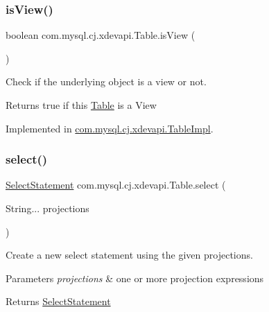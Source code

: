 \mbox{\label{interfacecom_1_1mysql_1_1cj_1_1xdevapi_1_1_table_a17dc243982bdbd3c0024699d3fb5bd5e}} 
\subsubsection{\texorpdfstring{is\+View()}{isView()}}
{\footnotesize\ttfamily boolean com.\+mysql.\+cj.\+xdevapi.\+Table.\+is\+View (\begin{DoxyParamCaption}{ }\end{DoxyParamCaption})}

Check if the underlying object is a view or not.

\begin{DoxyReturn}{Returns}
true if this \mbox{\hyperlink{interfacecom_1_1mysql_1_1cj_1_1xdevapi_1_1_table}{Table}} is a View 
\end{DoxyReturn}


Implemented in \mbox{\hyperlink{classcom_1_1mysql_1_1cj_1_1xdevapi_1_1_table_impl_a92b2db897ad5ce4f950422956bfc4027}{com.\+mysql.\+cj.\+xdevapi.\+Table\+Impl}}.

\mbox{\label{interfacecom_1_1mysql_1_1cj_1_1xdevapi_1_1_table_a36559f114d9638a63d8743f1f1630017}} 
\subsubsection{\texorpdfstring{select()}{select()}}
{\footnotesize\ttfamily \mbox{\hyperlink{interfacecom_1_1mysql_1_1cj_1_1xdevapi_1_1_select_statement}{Select\+Statement}} com.\+mysql.\+cj.\+xdevapi.\+Table.\+select (\begin{DoxyParamCaption}\item[{String...}]{projections }\end{DoxyParamCaption})}

Create a new select statement using the given projections.


\begin{DoxyParams}{Parameters}
{\em projections} & one or more projection expressions \\
\hline
\end{DoxyParams}
\begin{DoxyReturn}{Returns}
\mbox{\hyperlink{interfacecom_1_1mysql_1_1cj_1_1xdevapi_1_1_select_statement}{Select\+Statement}} 
\end{DoxyReturn}


